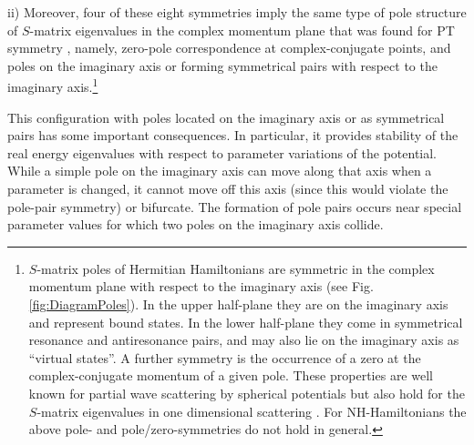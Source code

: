 ii) Moreover,
four of these eight symmetries  imply the same
type of pole structure of $S$-matrix eigenvalues in the complex momentum plane that was found for PT symmetry \cite{Muga2004},
namely, zero-pole correspondence at complex-conjugate points, and poles on the imaginary axis or forming symmetrical pairs with respect to the imaginary
axis.\footnote{%
$S$-matrix poles of Hermitian Hamiltonians   are symmetric in the complex momentum plane with respect to the imaginary axis (see Fig. \ref{fig:DiagramPoles}).
In the upper half-plane  they are on the imaginary axis and represent bound states.   In the lower half-plane they come in symmetrical
resonance and antiresonance pairs, and may also lie on the imaginary axis as ``virtual states''. A further symmetry is the occurrence of a zero
at the complex-conjugate momentum of a given pole. These properties are well known for partial wave scattering by spherical potentials
but also hold for the $S$-matrix eigenvalues in one dimensional scattering \cite{Muga2004}.
For NH-Hamiltonians  the above pole- and pole/zero-symmetries do not hold in general.}



This configuration with poles located on the imaginary  axis or as symmetrical pairs has some important consequences. In particular, it provides stability of the real energy eigenvalues with respect to parameter variations of the potential. While a simple pole on the imaginary axis can move along that axis when a parameter is changed, it cannot move off this axis (since this would violate the pole-pair symmetry) or bifurcate. The formation of pole pairs occurs near special  parameter values for which two poles on the imaginary axis collide.





